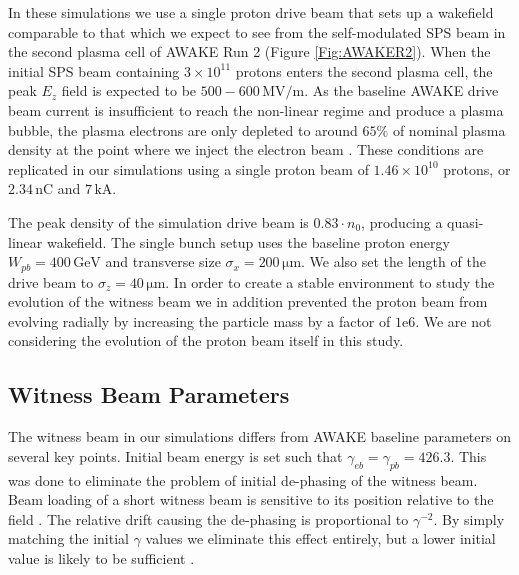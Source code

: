 \documentclass[aps,prstab,reprint,amsmath,amssymb,groupedaddress]{revtex4-1}
\newcommand{\unit}[1]{\,\mathrm{#1}}
\newcommand{\funit}[2]{\,\mathrm{#1}/\mathrm{#2}}
\newcommand{\mexp}[1]{\mathrm{e}{#1}}
\newcommand{\nexp}[1]{\times 10^{#1}}
\begin{document}
In these simulations we use a single proton drive beam that sets up a wakefield comparable to that which we expect to
see from the self-modulated SPS beam in the second plasma cell of AWAKE Run 2 (Figure \ref{Fig:AWAKER2}). When the
initial SPS beam containing $3\nexp{11}$ protons \cite{gschwendtner:2016} enters the second plasma cell, the peak
$E_{z}$ field is expected to be $500-600\funit{MV}{m}$. As the baseline AWAKE drive beam current is insufficient to
reach the non-linear regime and produce a plasma bubble, the plasma electrons are only depleted to around $65\%$ of
nominal plasma density at the point where we inject the electron beam \cite{awake_collaboration:2016}. These conditions
are replicated in our simulations using a single proton beam of $1.46\nexp{10}$ protons, or $2.34\unit{nC}$ and
$7\unit{kA}$.

The peak density of the simulation drive beam is $0.83\cdot n_{0}$, producing a quasi-linear wakefield. The single bunch
setup uses the baseline proton energy $W_{pb} = 400\unit{GeV}$ and transverse size $\sigma_{x} = 200\unit{\mu m}$. We
also set the length of the drive beam to $\sigma_{z} = 40\unit{\mu m}$. In order to create a stable environment to study
the evolution of the witness beam we in addition prevented the proton beam from evolving radially by increasing the
particle mass by a factor of $1\mexp{6}$. We are not considering the evolution of the proton beam itself in this study.

\subsection[\label{S:M:Setup}]{Witness Beam Parameters}

The witness beam in our simulations differs from AWAKE baseline parameters on several key points. Initial beam energy is
set such that $\gamma_{eb} = \gamma_{pb} = 426.3$. This was done to eliminate the problem of initial de-phasing of the
witness beam. Beam loading of a short witness beam is sensitive to its position relative to the field
\cite{tzoufras:2009}. The relative drift causing the de-phasing is proportional to $\gamma^{-2}$. By simply matching the
initial $\gamma$ values we eliminate this effect entirely, but a lower initial value is likely to be sufficient
\cite{berglyd_olsen:2015}.
\end{document}
